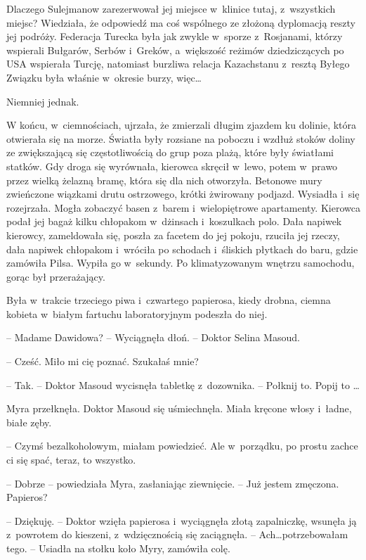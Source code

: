 \documentclass[oneside,polish,11pt,sfheadings]{mwbk}
\begin{document}
Dlaczego Sulejmanow zarezerwował jej miejsce w~klinice tutaj, z~wszystkich miejsc? Wiedziała, że odpowiedź ma coś wspólnego ze złożoną
dyplomacją reszty jej podróży. Federacja Turecka była jak zwykle w~sporze z~Rosjanami, którzy wspierali Bułgarów, Serbów i~Greków, a~większość reżimów dziedziczących po USA wspierała Turcję, natomiast
burzliwa relacja Kazachstanu z~resztą Byłego Związku była właśnie w~okresie burzy, więc\ldots

Niemniej jednak.

W końcu, w~ciemnościach, ujrzała, że zmierzali długim zjazdem ku
dolinie, która otwierała się na morze. Światła były rozsiane na poboczu
i wzdłuż stoków doliny ze zwiększającą się częstotliwością do grup poza
plażą, które były światłami statków. Gdy droga się wyrównała, kierowca
skręcił w~lewo, potem w~prawo przez wielką żelazną bramę, która się dla
nich otworzyła. Betonowe mury zwieńczone wiązkami drutu ostrzowego,
krótki żwirowany podjazd. Wysiadła i~się rozejrzała. Mogła zobaczyć
basen z~barem i~wielopiętrowe apartamenty. Kierowca podał jej bagaż
kilku chłopakom w~dżinsach i~koszulkach polo. Dała napiwek kierowcy,
zameldowała się, poszła za facetem do jej pokoju, rzuciła jej rzeczy,
dała napiwek chłopakom i~wróciła po schodach i~śliskich płytkach do
baru, gdzie zamówiła Pilsa. Wypiła go w~sekundy. Po klimatyzowanym
wnętrzu samochodu, gorąc był przerażający.

Była w~trakcie trzeciego piwa i~czwartego papierosa, kiedy drobna,
ciemna kobieta w~białym fartuchu laboratoryjnym podeszła do niej.

-- Madame Dawidowa? -- Wyciągnęła dłoń. -- Doktor Selina Masoud.

-- Cześć. Miło mi cię poznać. Szukałaś mnie?

-- Tak. -- Doktor Masoud wycisnęła tabletkę z~dozownika. -- Połknij to.
Popij to \ldots

Myra przełknęła. Doktor Masoud się uśmiechnęła. Miała kręcone włosy i~ładne, białe zęby. 

-- Czymś bezalkoholowym, miałam powiedzieć. Ale w~porządku, po prostu zachce ci się spać, teraz, to wszystko.

-- Dobrze -- powiedziała Myra, zasłaniając ziewnięcie. -- Już jestem
zmęczona. Papieros?

-- Dziękuję. -- Doktor wzięła papierosa i~wyciągnęła złotą zapalniczkę,
wsunęła ją z~powrotem do kieszeni, z~wdzięcznością się zaciągnęła. -- Ach\ldots potrzebowałam tego. -- Usiadła na stołku koło Myry, zamówiła colę.
\end{document}

